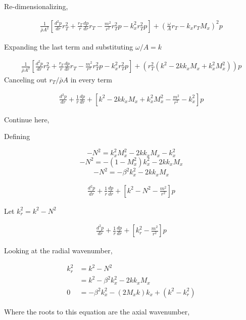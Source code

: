 Re-dimensionalizing,

\begin{align*}
    \frac{1}{\bar{\rho} A^2}\left[
    \frac{ d^2 p}{d r} r_T^2+
    \frac{r_T}{r} 
    \frac{d p}{d r} r_T - 
    \frac{m^2}{r^2}r_T^2 p - k_x^2r_T^2  p\right]
    + \left( \frac{\omega }{A}r_T - k_x r_T M_x \right)^2p 
\end{align*}

Expanding the last term and substituting $\omega/A = k$

\begin{align*}
    \frac{1}{\bar{\rho} A^2}\left[
    \frac{ d^2 p}{d r} r_T^2+
    \frac{r_T}{r} 
    \frac{d p}{d r} r_T - 
    \frac{m^2}{r^2}r_T^2 p - k_x^2r_T^2  p\right]
    +\left( r_T^2\left(
        k^2 - 2 k k_x M_x + k_x^2 M_x^2 \right)
    \right)p 
\end{align*}
Canceling out $r_T/\bar{\rho}A$ in every term


\begin{align*}
    \frac{ d^2 p}{d r} +
    \frac{1}{r} 
    \frac{d p}{d r} + \left[ 
    k^2 - 2 k k_x M_x + k_x^2 M_x^2- \frac{m^2}{r^2}  - k_x^2\right]p 
\end{align*}

Continue here,


Defining 

$$- N^2 = k_x^2 M_x^2 - 2 k k_x M_x - k_x^2 $$
$$-N^2 = -(1 -  M_x^2)k_x^2 - 2 k k_x M_x  $$
$$-N^2 =  -\beta^2 k_x^2 - 2 k k_x M_x  $$


\begin{align*}
    \frac{ d^2 p}{d r} +
    \frac{1}{r} 
    \frac{d p}{d r} + \left[ 
    k^2 - N^2 - \frac{m^2}{r^2}  \right]p 
\end{align*}

Let $k_r^2 = k^2 - N^2$


\begin{align*}
    \frac{ d^2 p}{d r} +
    \frac{1}{r} 
    \frac{d p}{d r} + \left[ 
    k_r^2  - \frac{m^2}{r^2}  \right]p 
\end{align*}

Looking at the radial wavenumber,

\begin{align*}
    k_r^2 &= k^2 - N^2 \\
          &= k^2-\beta^2 k_x^2 - 2 k k_x M_x \\
    0 &=  -\beta ^2 k_x ^2 -  \left( 2M_x k \right)k_x +(k^2 - k_r^2)
\end{align*}

Where the roots to this equation are the axial wavenumber,


